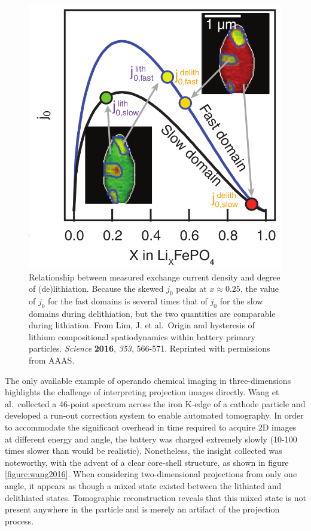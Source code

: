 \documentclass[journal=cmatex,manuscript=perspective]{achemso}
\begin{document}
\begin{figure}
  \includegraphics[width=\textwidth]{lim2016.png}
  \caption{Relationship between measured exchange current density and
    degree of (de)lithiation. Because the skewed $j_0$ peaks at $x
    \approx 0.25$, the value of $j_0$ for the fast domains is several
    times that of $j_0$ for the slow domains during delithiation, but
    the two quantities are comparable during lithiation. From Lim,
    J. et al.\ Origin and hysteresis of lithium compositional
    spatiodynamics within battery primary particles. \textit{Science}
    \textbf{2016}, \textit{353}, 566-571. Reprinted with permissions
    from AAAS.}
  \label{figure:lim2016}
\end{figure}

 The only available example of operando chemical imaging in
 three-dimensions highlights the challenge of interpreting projection
 images directly. Wang et al.\ collected a 46-point spectrum across
 the iron K-edge of a  cathode particle and developed a
 run-out correction system to enable automated tomography. In order to
 accommodate the significant overhead in time required to acquire 2D
 images at different energy and angle, the battery was charged
 extremely slowly (10-100 times slower than would be
 realistic). Nonetheless, the insight collected was noteworthy, with
 the advent of a clear core-shell structure, as shown in figure
 \ref{figure:wang2016}. When considering two-dimensional projections
 from only one angle, it appears as though a mixed state existed
 between the lithiated and delithiated states. Tomographic
 reconstruction reveals that this mixed state is not present anywhere
 in the particle and is merely an artifact of the projection
 process\cite{wang2016}.
\end{document}
